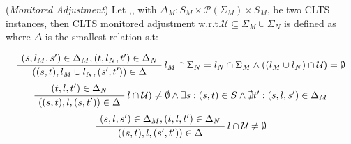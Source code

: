 \begin{definition} 
	\label{def:monitored_adjustment}(\emph{Monitored Adjustment}) Let ,, with $\Delta_M : S_M \times \mathcal{P}(\Sigma_M) \times S_M$, be two CLTS instances, then CLTS monitored adjustment w.r.t.$\mathcal{U} \subseteq \Sigma_M \cup \Sigma_N$ is defined as  where $\Delta$ is the smallest relation s.t:
	\begin{center}
		\begin{equation}
		\AxiomC{$(s, l_M, s') \in \Delta_M,(t, l_N, t') \in \Delta_N  $}\RightLabel{$l_M \cap \Sigma_N = l_N \cap \Sigma_M \wedge ((l_M \cup l_N)\cap \mathcal{U}) = \emptyset$}
		\UnaryInfC{$((s,t),l_M \cup l_N,(s',t')) \in \Delta$}
		\DisplayProof	
		\end{equation}	
		\begin{equation}
		\AxiomC{$(t, l, t') \in \Delta_N  $}\RightLabel{$l \cap \mathcal{U}) \neq \emptyset \wedge \exists s:(s,t)\in S \wedge \nexists t':(s,l,s')\in \Delta_M$}
		\UnaryInfC{$((s,t),l,(s,t')) \in \Delta$}
		\DisplayProof	
		\end{equation}		
		\begin{equation}
		\AxiomC{$(s, l, s') \in \Delta_M,(t, l, t') \in \Delta_N  $}\RightLabel{$l \cap \mathcal{U} \neq \emptyset$}
		\UnaryInfC{$((s,t),l,(s',t')) \in \Delta$}
		\DisplayProof	
		\end{equation}			
	\end{center}
\end{definition}